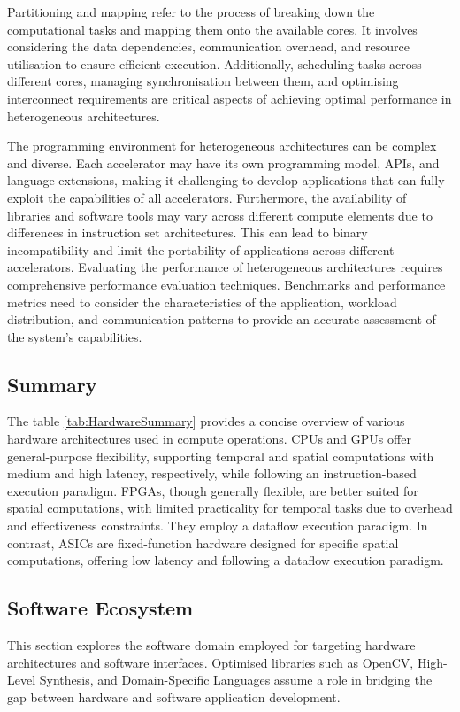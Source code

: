 Partitioning and mapping refer to the process of breaking down the computational tasks and mapping them onto the available cores. It involves considering the data dependencies, communication overhead, and resource utilisation to ensure efficient execution. Additionally, scheduling tasks across different cores, managing synchronisation between them, and optimising interconnect requirements are critical aspects of achieving optimal performance in heterogeneous architectures.

The programming environment for heterogeneous architectures can be complex and diverse. Each accelerator may have its own programming model, APIs, and language extensions, making it challenging to develop applications that can fully exploit the capabilities of all accelerators. Furthermore, the availability of libraries and software tools may vary across different compute elements due to differences in instruction set architectures. This can lead to binary incompatibility and limit the portability of applications across different accelerators. Evaluating the performance of heterogeneous architectures requires comprehensive performance evaluation techniques. Benchmarks and performance metrics need to consider the characteristics of the application, workload distribution, and communication patterns to provide an accurate assessment of the system's capabilities.


\subsection{Summary}

The table \ref{tab:HardwareSummary} provides a concise overview of various hardware architectures used in compute operations. CPUs and GPUs offer general-purpose flexibility, supporting temporal and spatial computations with medium and high latency, respectively, while following an instruction-based execution paradigm. FPGAs, though generally flexible, are better suited for spatial computations, with limited practicality for temporal tasks due to overhead and effectiveness constraints. They employ a dataflow execution paradigm. In contrast, ASICs are fixed-function hardware designed for specific spatial computations, offering low latency and following a dataflow execution paradigm.

\subsection{Software Ecosystem}
This section explores the software domain employed for targeting hardware architectures and software interfaces. Optimised libraries such as OpenCV, High-Level Synthesis, and Domain-Specific Languages assume a role in bridging the gap between hardware and software application development.

